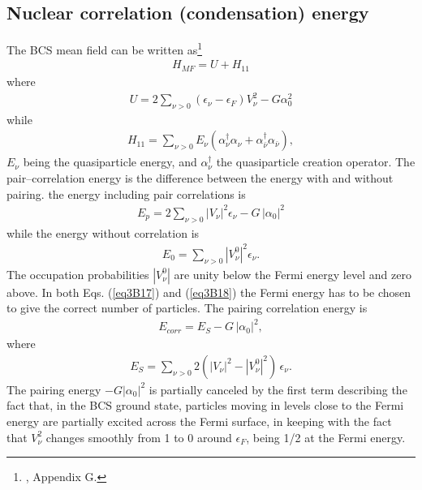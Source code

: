 \begin{subappendices}
\subsection{Nuclear correlation (condensation) energy}
The BCS mean field can be written as\footnote{\cite{Brink:05}, Appendix G.}
 \begin{align}\label{eq3B14}
H_{MF}=U+H_{11}
 \end{align} 
where
 \begin{align}\label{eq3B15}
 U=2\sum_{\nu>0}(\epsilon_\nu-\epsilon_F)V_\nu^2-G\alpha_0^2
 \end{align} 
while
 \begin{align}\label{eq3B16}
H_{11}=\sum_{\nu>0}E_\nu(\alpha_\nu^\dagger\alpha_\nu+\alpha_{\bar\nu}^\dagger\alpha_{\bar\nu}),
 \end{align} 
$E_\nu$ being the quasiparticle energy, and $\alpha^\dagger_\nu$ the quasiparticle creation operator. The pair--correlation energy is the difference between the energy with and without pairing. the energy including pair correlations is
 \begin{align}\label{eq3B17}
E_p=2\sum_{\nu>0}|V_\nu|^2\epsilon_\nu-G\,|\alpha_0|^2
 \end{align} 
 while the energy without correlation is
  \begin{align}\label{eq3B18}
  E_0=\sum_{\nu>0}|V^0_\nu|^2\epsilon_\nu.
  \end{align} 
 The occupation probabilities $|V^0_\nu|$ are unity below the Fermi energy level and zero above. In both Eqs. (\ref{eq3B17}) and (\ref{eq3B18}) the Fermi energy has to be chosen to give the correct number of particles. The pairing correlation energy is 
   \begin{align}\label{eq3B19}
E_{corr}=E_S-G\,|\alpha_0|^2,
   \end{align} 
 where
   \begin{align}\label{eq3B20}
E_S=\sum_{\nu>0}2(|V_\nu|^2-|V^0_\nu|^2)\,\epsilon_\nu.
   \end{align}  
 The  pairing energy $-G|\alpha_0|^2$ is partially canceled by the first term describing the fact that, in the BCS ground state, particles moving in levels close to the Fermi energy are partially excited across the Fermi surface, in keeping with the fact that $V_\nu^2$ changes smoothly from 1 to 0 around $\epsilon_F$, being 1/2 at the Fermi energy.
 

\end{subappendices}

